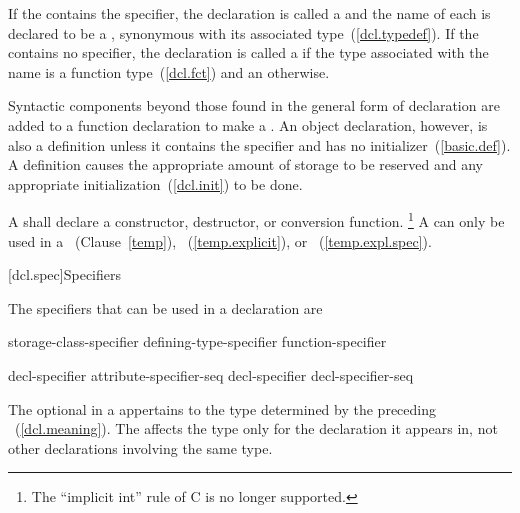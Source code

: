 \pnum
If the  contains the 
specifier, the declaration is called a  and the name
of each 
is declared to be a , synonymous with its
associated type~(\ref{dcl.typedef}). If the
 contains no  specifier, the
declaration is called a  if
the type associated with the name is a function type~(\ref{dcl.fct}) and
an  otherwise.

\pnum
{}%
Syntactic components beyond those found in the general form of
declaration are added to a function declaration to make a
. An object declaration, however, is also
a definition unless it contains the  specifier and has no
initializer~(\ref{basic.def}).
%
A
definition causes the appropriate amount of storage to be reserved and
any appropriate initialization~(\ref{dcl.init}) to be done.

\pnum
A  shall declare a
constructor, destructor, or conversion function.  \footnote{The
``implicit int'' rule of C is no longer supported.}
\enternote
A  can only be used in a
~(Clause~\ref{temp}),
~(\ref{temp.explicit}), or
~(\ref{temp.expl.spec}).
\exitnote

[dcl.spec]{Specifiers}%

\pnum
{}%
The specifiers that can be used in a declaration are

\begin{bnf}
\br
    storage-class-specifier\br
    defining-type-specifier\br
    function-specifier\br
    \br
    \br
\end{bnf}

\begin{bnf}
\br
    decl-specifier attribute-specifier-seq\opt\br
    decl-specifier decl-specifier-seq
\end{bnf}

The optional  in a 
appertains to the type determined by the preceding
~(\ref{dcl.meaning}). The 
affects the type only for the declaration it appears in, not other declarations involving the
same type.

